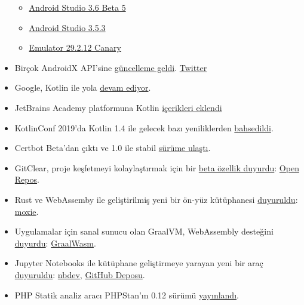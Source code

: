 \documentclass[11pt]{article}
\begin{document}
\begin{itemize}
\begin{itemize}
\item \href{https://androidstudio.googleblog.com/2019/12/android-studio-36-beta-5-available.html}{Android Studio 3.6 Beta 5}
\item \href{https://androidstudio.googleblog.com/2019/12/android-studio-353-available.html}{Android Studio 3.5.3}
\item \href{https://androidstudio.googleblog.com/2019/12/emulator-29212-to-canary.html}{Emulator 29.2.12 Canary}
\end{itemize}
\item Birçok AndroidX API'sine \href{https://developer.android.com/jetpack/androidx/versions/all-channel\#december\_4\_2019}{güncelleme geldi}. \href{https://mobile.twitter.com/ianhlake/status/1202322055124750337}{Twitter}
\item Google, Kotlin ile yola \href{https://android-developers.googleblog.com/2019/12/androids-commitment-to-kotlin.html}{devam ediyor}.
\item JetBrains Academy platformuna Kotlin \href{https://blog.jetbrains.com/blog/2019/12/05/jetbrains-academy-kotlin/}{içerikleri eklendi}
\item KotlinConf 2019'da Kotlin 1.4 ile gelecek bazı yeniliklerden \href{https://blog.jetbrains.com/kotlin/2019/12/what-to-expect-in-kotlin-1-4-and-beyond/}{bahsedildi}.
\item Certbot Beta'dan çıktı ve 1.0 ile stabil \href{https://www.eff.org/deeplinks/2019/12/certbot-leaves-beta-release-10}{sürüme ulaştı}.
\item GitClear, proje keşfetmeyi kolaylaştırmak için bir \href{https://www.gitclear.com/blog/introducing\_open\_repos\_a\_free\_product\_to\_aid\_open\_source\_development}{beta özellik duyurdu}:
\href{https://www.gitclear.com/open\_repos}{Open Repos}.
\item Rust ve WebAssemby ile geliştirilmiş yeni bir ön-yüz kütüphanesi \href{https://blog.anp.lol/rust/moxie-intro/}{duyuruldu}:
\href{https://github.com/anp/moxie}{moxie}.
\item Uygulamalar için sanal sunucu olan GraalVM, WebAssembly desteğini \href{https://medium.com/graalvm/announcing-graalwasm-a-webassembly-engine-in-graalvm-25cd0400a7f2}{duyurdu}:
\href{https://github.com/oracle/graal/tree/master/wasm}{GraalWasm}.
\item Jupyter Notebooks ile kütüphane geliştirmeye yarayan yeni bir araç
\href{https://www.fast.ai/2019/12/02/nbdev/}{duyuruldu}: \href{https://nbdev.fast.ai/}{nbdev}, \href{https://github.com/fastai/nbdev}{GitHub Deposu}.
\item PHP Statik analiz aracı PHPStan'ın 0.12 sürümü \href{https://medium.com/ondrejmirtes/phpstan-0-12-released-f1a88036535d}{yayınlandı}.

\end{itemize}
\end{document}
